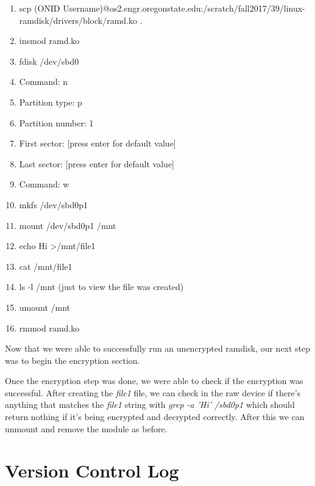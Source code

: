 \documentclass[letterpaper,10pt,draftclsnofoot,onecolumn,titlepage]{IEEEtran}
\begin{document}
	\begin{enumerate}
		\item scp (ONID Username)@os2.engr.oregonstate.edu:/scratch/fall2017/39/linux-ramdisk/drivers/block/ramd.ko .
		\item insmod ramd.ko
		\item fdisk /dev/sbd0

		\item Command: n
		\item Partition type: p
		\item Partition number: 1
		\item First sector: [press enter for default value]
		\item Last sector: [press enter for default value]

		\item Command: w

		\item mkfs /dev/sbd0p1
		\item mount /dev/sbd0p1 /mnt
		\item echo Hi \textgreater /mnt/file1
		\item cat /mnt/file1
		\item ls -l /mnt (just to view the file was created)
		\item umount /mnt
		\item rmmod ramd.ko 
	\end{enumerate}

Now that we were able to successfully run an unencrypted ramdisk, our next step was to begin the encryption section. 

Once the encryption step was done, we were able to check if the encryption was successful. After creating the \textit{file1} file, we can check in the raw device if there's anything that matches the \textit{file1} string with \textit{grep -a 'Hi' /sbd0p1} which should return nothing if it's being encrypted and decrypted correctly. After this we can unmount and remove the module as before.

\section{Version Control Log}
\end{document}
